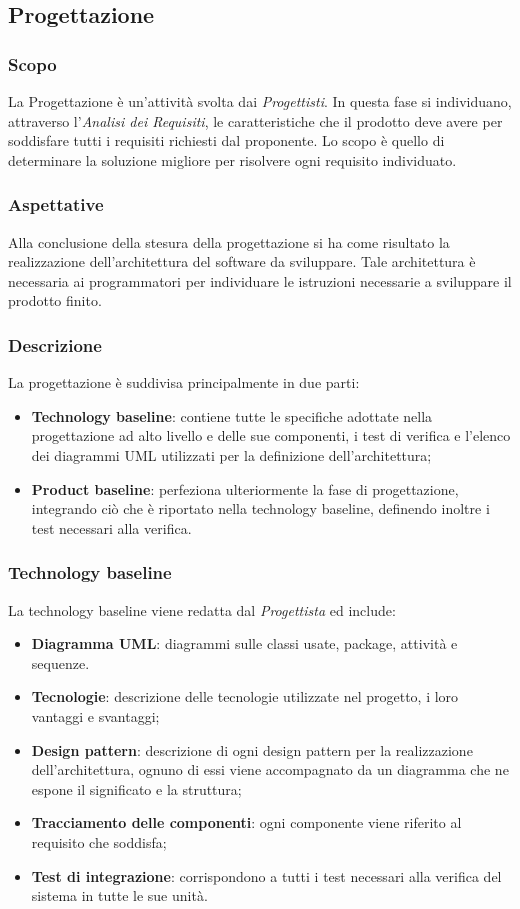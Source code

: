\subsection{Progettazione}\label{2.2.4}
\subsubsection{Scopo}\label{2.2.4.1}
La Progettazione è un'attività svolta dai \textit{Progettisti}. In questa fase si individuano, attraverso l'\textit{Analisi dei Requisiti}, le caratteristiche che il prodotto deve avere per soddisfare tutti i requisiti richiesti dal proponente. Lo scopo è quello di determinare la soluzione migliore per risolvere ogni requisito individuato. 
\subsubsection{Aspettative}\label{2.2.4.2}
Alla conclusione della stesura della progettazione si ha come risultato la realizzazione dell'architettura del software da sviluppare. Tale architettura è necessaria ai programmatori per individuare le istruzioni necessarie a sviluppare il prodotto finito.
\subsubsection{Descrizione}\label{2.2.4.3}
La progettazione è suddivisa principalmente in due parti:
\begin{itemize}
	\item \textbf{Technology baseline}: contiene tutte le specifiche adottate nella progettazione ad alto livello e delle sue componenti, i test di verifica e l'elenco dei diagrammi UML utilizzati per la definizione dell'architettura;
	\item \textbf{Product baseline}: perfeziona ulteriormente la fase di progettazione, integrando ciò che è riportato nella technology baseline, definendo inoltre i test necessari alla verifica.
\end{itemize}

\subsubsection{Technology baseline}\label{2.2.4.4}
La technology baseline viene redatta dal \textit{Progettista} ed include:
\begin{itemize}
	\item \textbf{Diagramma UML}: diagrammi sulle classi usate, package, attività e sequenze.
	\item \textbf{Tecnologie}: descrizione delle tecnologie utilizzate nel progetto, i loro vantaggi e svantaggi;
	\item \textbf{Design pattern}: descrizione di ogni design pattern per la realizzazione dell'architettura, ognuno di essi viene accompagnato da un diagramma che ne espone il significato e la struttura; 
	\item \textbf{Tracciamento delle componenti}: ogni componente viene riferito al requisito che soddisfa;
	\item \textbf{Test di integrazione}: corrispondono a tutti i test necessari alla verifica del sistema in tutte le sue unità.
\end{itemize}
